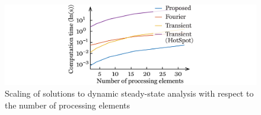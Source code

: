 \begin{figure}
  \centering
  \includegraphics[width=1.0\linewidth]{include/assets/figures/utopia-dynamic-steady-state-speed-elements.pdf}
  \caption{
    Scaling of solutions to dynamic steady-state analysis with respect to the
    number of processing elements
  }
\end{figure}
